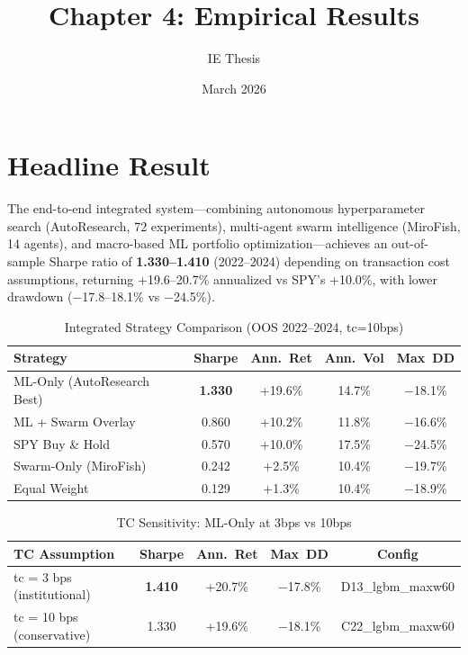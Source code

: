 \documentclass[12pt]{article}
\title{Chapter 4: Empirical Results}\author{IE Thesis}\date{March 2026}
\begin{document}
\maketitle

\section{Headline Result}
The end-to-end integrated system---combining autonomous hyperparameter search (AutoResearch, 72 experiments), multi-agent swarm intelligence (MiroFish, 14 agents), and macro-based ML portfolio optimization---achieves an out-of-sample Sharpe ratio of \textbf{1.330--1.410} (2022--2024) depending on transaction cost assumptions, returning +19.6--20.7\% annualized vs SPY's +10.0\%, with lower drawdown ($-$17.8--18.1\% vs $-$24.5\%).

\begin{table}[H]\centering
\caption{Integrated Strategy Comparison (OOS 2022--2024, tc=10bps)}\label{tab:integrated}
\begin{tabular}{lcccc}\toprule
Strategy & Sharpe & Ann.~Ret & Ann.~Vol & Max~DD \\\midrule
ML-Only (AutoResearch Best) & \textbf{1.330} & +19.6\% & 14.7\% & $-$18.1\% \\
ML + Swarm Overlay & 0.860 & +10.2\% & 11.8\% & $-$16.6\% \\
SPY Buy \& Hold & 0.570 & +10.0\% & 17.5\% & $-$24.5\% \\
Swarm-Only (MiroFish) & 0.242 & +2.5\% & 10.4\% & $-$19.7\% \\
Equal Weight & 0.129 & +1.3\% & 10.4\% & $-$18.9\% \\
\bottomrule\end{tabular}\end{table}

\begin{table}[H]\centering
\caption{TC Sensitivity: ML-Only at 3bps vs 10bps}\label{tab:tc_sens}
\begin{tabular}{lcccc}\toprule
TC Assumption & Sharpe & Ann.~Ret & Max~DD & Config \\\midrule
tc = 3 bps (institutional) & \textbf{1.410} & +20.7\% & $-$17.8\% & D13\_lgbm\_maxw60 \\
tc = 10 bps (conservative) & 1.330 & +19.6\% & $-$18.1\% & C22\_lgbm\_maxw60 \\
\bottomrule\end{tabular}\end{table}
\end{document}
